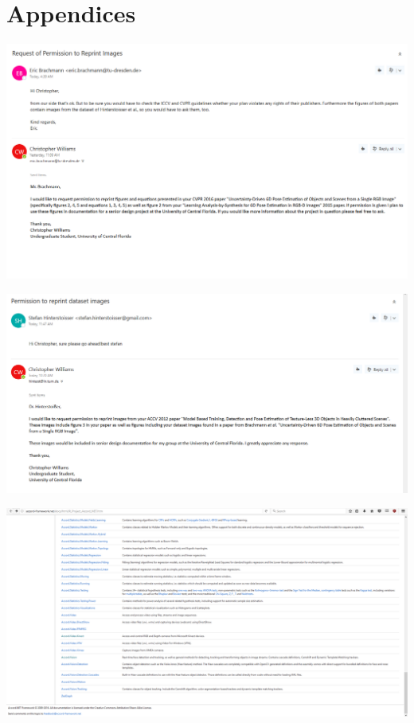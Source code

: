\documentclass[12pt]{article}
\let\origfigure=\figure
\let\endorigfigure=\endfigure
\renewenvironment{figure}[1][]{%
  \origfigure[H]
}{%
  \endorigfigure
}
\begin{document}
\section{Appendices}\label{appendices}

\begin{figure}
\centering
\includegraphics{Pictures/brachmannPermission.png}
\caption{Correspondence with Eric Brachmann of \autocite{brachmann}}
\end{figure}

\begin{figure}
\centering
\includegraphics{Pictures/hinterstoisserPermission.png}
\caption{Correspondence with Stefan Hinterstoisser of
\autocite{hinterstoisser}}
\end{figure}

\begin{figure}
\centering
\includegraphics{Pictures/accordLicense.png}
\caption{Proof of Accord.NET License}
\end{figure}
\end{document}
